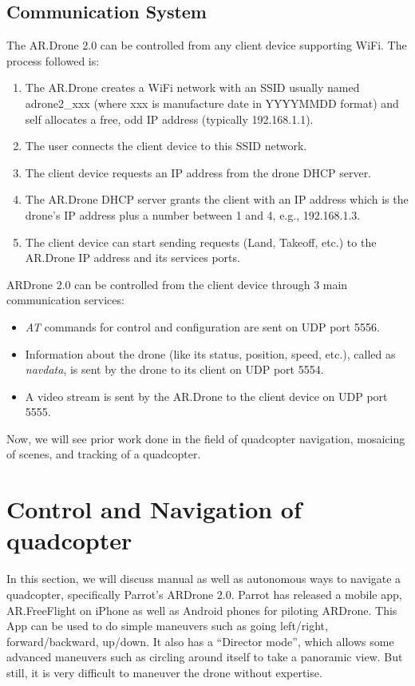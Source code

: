 \subsection{Communication System}
The AR.Drone 2.0 can be controlled from any client device supporting WiFi. The 
process followed is:
\begin{enumerate}
  \item The AR.Drone creates a WiFi network with an SSID usually named
adrone2\_xxx (where xxx is manufacture date in YYYYMMDD format) and self
allocates a free, odd IP address (typically 192.168.1.1).

   \item The user connects the client device to this SSID network.
   \item The client device requests an IP address from the drone DHCP server.
   \item The AR.Drone DHCP server grants the client with an IP address which is
   the drone's IP address plus a number between 1 and 4, e.g., 192.168.1.3.
   \item The client device can start sending requests (Land, Takeoff, etc.) to
   the AR.Drone IP address and its services ports.
\end{enumerate}

ARDrone 2.0 can be controlled from the client device through 3 main communication
services: 
\begin{itemize}
\item \textit{AT} commands for control and configuration are sent on UDP
port 5556.
\item Information about the drone (like its status, position,  speed, 
etc.), called as \textit{navdata}, is sent by the drone to its client on UDP
port 5554.  
\item A video stream is sent by the AR.Drone to the client device on UDP port
5555.
\end{itemize}

Now, we will see prior work done in the field of quadcopter navigation,
mosaicing of scenes, and tracking of a quadcopter.

\section{Control and Navigation of quadcopter}
In this section, we will discuss manual as well as autonomous ways to navigate
a quadcopter, specifically Parrot's ARDrone 2.0.
Parrot has released a mobile app, AR.FreeFlight on iPhone as well as Android
phones for piloting ARDrone. This App can be used to do simple maneuvers such
as going left/right, forward/backward, up/down. It also has a ``Director mode'',
which allows some advanced maneuvers such as circling around itself to take
a panoramic view. But still, it is very difficult to maneuver the drone without
expertise.

